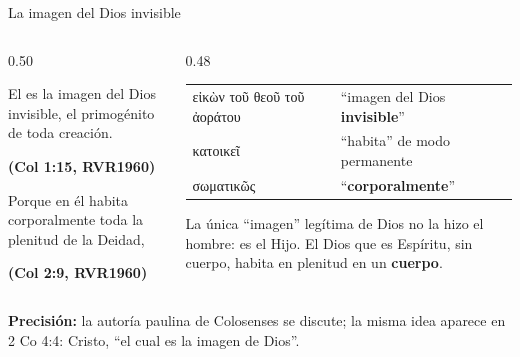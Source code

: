 \documentclass[hyperref={bookmarks=false},aspectratio=169]{beamer}
\newcommand{\grc}[1]{\foreignlanguage{ancientgreek}{#1}}
\newcommand{\fuente}[1]{\par\hfill{\upshape\bfseries\footnotesize\textcolor{azul}{#1}}}
\newcommand{\destacar}[1]{\textbf{\textcolor{azul}{#1}}}
\newcommand{\precision}[1]{{\footnotesize\color{gris}\textbf{Precisión:} #1}}
\begin{document}
\begin{frame}{La imagen del Dios invisible}
\begin{columns}[t,onlytextwidth]
\begin{column}{0.50\textwidth}
\begin{cita}El es la imagen del Dios invisible, el primogénito de toda creación.\fuente{(Col 1:15, RVR1960)}\end{cita}
\begin{cita}Porque en él habita corporalmente toda la plenitud de la Deidad,\fuente{(Col 2:9, RVR1960)}\end{cita}
\end{column}
\begin{column}{0.48\textwidth}\scriptsize\renewcommand{\arraystretch}{1.12}
\begin{tabular}{@{}>{\RaggedRight\arraybackslash}p{2.2cm}>{\RaggedRight\arraybackslash}p{3.4cm}@{}}
\toprule
\grc{εἰκὼν τοῦ θεοῦ τοῦ ἀοράτου} & ``imagen del Dios \destacar{invisible}'' \\
\grc{κατοικεῖ} & ``habita'' de modo permanente \\
\grc{σωματικῶς} & ``\destacar{corporalmente}'' \\
\bottomrule
\end{tabular}\par\smallskip
\small La única ``imagen'' legítima de Dios no la hizo el hombre: es el Hijo. El Dios que es Espíritu, sin cuerpo, habita en plenitud en un \destacar{cuerpo}.
\end{column}
\end{columns}\par\smallskip
\precision{la autoría paulina de Colosenses se discute; la misma idea aparece en 2 Co 4:4: Cristo, ``el cual es la imagen de Dios''.}
\end{frame}
\end{document}
